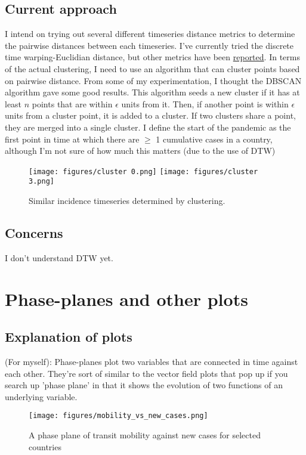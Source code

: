 \documentclass{article}
\begin{document}
\subsection{Current approach}
I intend on trying out several different timeseries distance metrics to determine the pairwise distances between each timeseries. I've currently tried the discrete time warping-Euclidian distance, but other metrics have been \href{https://link.springer.com/chapter/10.1007/978-3-030-28665-1_31}{reported}. In terms of the actual clustering, I need to use an algorithm that can cluster points based on pairwise distance. From some of my experimentation, I thought the DBSCAN algorithm gave some good results. This algorithm seeds a new cluster if it has at least $n$ points that are within $\epsilon$ units from it. Then, if another point is within $\epsilon$ units from a cluster point, it is added to a cluster. If two clusters share a point, they are merged into a single cluster. I define the start of the pandemic as the first point in time at which there are $\geq$ 1 cumulative cases in a country, although I'm not sure of how much this matters (due to the use of DTW)

\begin{figure}[h!]
    \centering
    \texttt{[image: figures/cluster 0.png]}
    \texttt{[image: figures/cluster 3.png]}
    \caption{Similar incidence timeseries determined by clustering.}
    \label{fig:my_label}
\end{figure}

\subsection{Concerns}
I don't understand DTW yet. 

\section{Phase-planes and other plots}
\subsection{Explanation of plots}
(For myself): Phase-planes plot two variables that are connected in time against each other. They're sort of similar to the vector field plots that pop up if you search up 'phase plane' in that it shows the evolution of two functions of an underlying variable.

\begin{figure}
    \centering
    \texttt{[image: figures/mobility\_vs\_new\_cases.png]}
    \caption{A phase plane of transit mobility against new cases for selected countries}
    \label{fig:my_label}
\end{figure}
\end{document}
